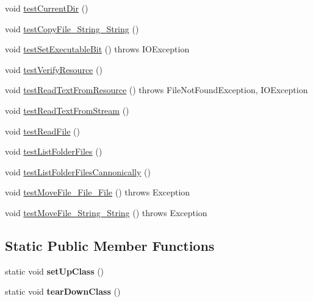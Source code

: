 \begin{DoxyCompactItemize}
\item 
void \hyperlink{class_c_a_s_u_a_l_1_1_file_operations_test_ade3db71a22f802b35dda0719144a1f1f}{test\-Current\-Dir} ()
\item 
void \hyperlink{class_c_a_s_u_a_l_1_1_file_operations_test_ac2121be1cb1c4b29e06316d02dcfdc8e}{test\-Copy\-File\-\_\-\-String\-\_\-\-String} ()
\item 
void \hyperlink{class_c_a_s_u_a_l_1_1_file_operations_test_af16a656363227430df9f44f73d7919c3}{test\-Set\-Executable\-Bit} ()  throws I\-O\-Exception 
\item 
void \hyperlink{class_c_a_s_u_a_l_1_1_file_operations_test_a0233125978104bbfb45cd27122d3fe75}{test\-Verify\-Resource} ()
\item 
void \hyperlink{class_c_a_s_u_a_l_1_1_file_operations_test_ae1454635ca7d34ee0a45fc8123e31f08}{test\-Read\-Text\-From\-Resource} ()  throws File\-Not\-Found\-Exception, I\-O\-Exception 
\item 
void \hyperlink{class_c_a_s_u_a_l_1_1_file_operations_test_a74b229a643c8e580138dd481ed0ac761}{test\-Read\-Text\-From\-Stream} ()
\item 
void \hyperlink{class_c_a_s_u_a_l_1_1_file_operations_test_aa271380060ef566d10799e9f8a1030e4}{test\-Read\-File} ()
\item 
void \hyperlink{class_c_a_s_u_a_l_1_1_file_operations_test_a322d0b0b74ec95e02e071d9cbd76b7cf}{test\-List\-Folder\-Files} ()
\item 
void \hyperlink{class_c_a_s_u_a_l_1_1_file_operations_test_a6f9395b88c03263c4f168543d5e0f1f6}{test\-List\-Folder\-Files\-Cannonically} ()
\item 
void \hyperlink{class_c_a_s_u_a_l_1_1_file_operations_test_a800ab0b35acd5da573c382bd05dc6be0}{test\-Move\-File\-\_\-\-File\-\_\-\-File} ()  throws Exception 
\item 
void \hyperlink{class_c_a_s_u_a_l_1_1_file_operations_test_a88880f23fba5c107cba6f67f5613b1df}{test\-Move\-File\-\_\-\-String\-\_\-\-String} ()  throws Exception 
\end{DoxyCompactItemize}
\subsection*{Static Public Member Functions}
\begin{DoxyCompactItemize}
\item 
\hypertarget{class_c_a_s_u_a_l_1_1_file_operations_test_a1230985a70e8a8df7e0eb18e3a3ec6e7}{static void {\bfseries set\-Up\-Class} ()}\label{class_c_a_s_u_a_l_1_1_file_operations_test_a1230985a70e8a8df7e0eb18e3a3ec6e7}

\item 
\hypertarget{class_c_a_s_u_a_l_1_1_file_operations_test_a6b190882b64a43ce262cb891f4958a66}{static void {\bfseries tear\-Down\-Class} ()}\label{class_c_a_s_u_a_l_1_1_file_operations_test_a6b190882b64a43ce262cb891f4958a66}

\end{DoxyCompactItemize}


